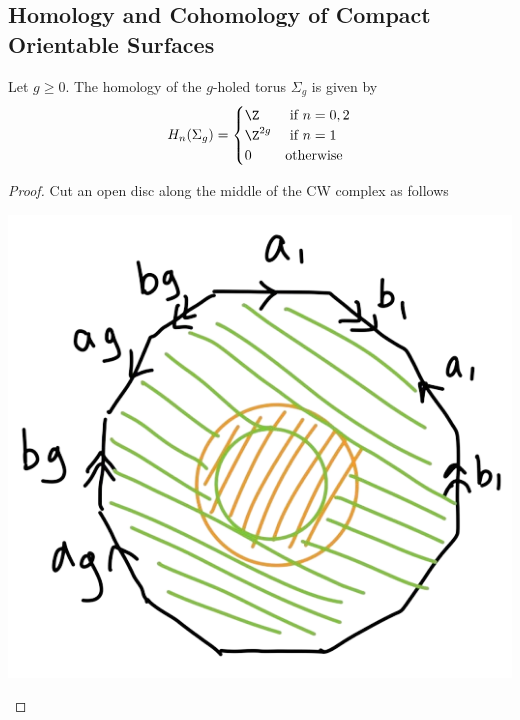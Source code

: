 \documentclass[a4paper]{article}
\begin{document}
\subsection{Homology and Cohomology of Compact Orientable Surfaces}
\begin{prp}{}{} Let $g\geq 0$. The homology of the $g$-holed torus $\Sigma_g$ is given by $$H_n(\Sigma_g)=\begin{cases}
\Z & \text{ if } n=0,2\\
\Z^{2g} & \text{ if } n=1\\
0 & \text{otherwise}
\end{cases}$$ \tcbline
\begin{proof}
Cut an open disc along the middle of the CW complex as follows

\begin{center}
\includegraphics[scale = 0.3]{Image 4}
\end{center}


\end{proof}
\end{prp}
\end{document}
